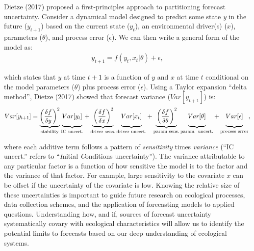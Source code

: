 \documentclass[12pt,]{article}
\begin{document}
Dietze (2017) proposed a first-principles approach to partitioning
forecast uncertainty. Consider a dynamical model designed to predict
some state \emph{y} in the future (\(y_{t+1}\)) based on the current
state (\(y_{t}\)), an environmental driver(s) (\(x\)), parameters
(\(\theta\)), and process error (\(\epsilon\)). We can then write a
general form of the model as: \vspace{-0.5em} \begin{align}
y_{t+1} = f(y_t, x_t|\theta) + \epsilon,
\end{align}

which states that \(y\) at time \(t+1\) is a function of \(y\) and \(x\)
at time \(t\) conditional on the model parameters (\(\theta\)) plus
process error (\(\epsilon\)). Using a Taylor expansion ``delta method'',
Dietze (2017) showed that forecast variance (\(Var[y_{t+1}]\)) is:
\vspace{-0.5em} \begin{align}
Var[y_{t+1}] = \underbrace{\left(\frac{\delta f}{\delta y} \right)^2}_{\text{stability}} 
               \underbrace{\vphantom{ \left(\frac{\delta f}{\delta y} \right)^2 } Var[y_t]}_{\text{IC uncert.}} +
               \underbrace{\vphantom{ \left(\frac{\delta f}{\delta y} \right)^2 }\left(\frac{\delta f}{\delta x} \right)^2}_{\text{driver sens.}} 
               \underbrace{\vphantom{ \left(\frac{\delta f}{\delta y} \right)^2 } Var[x_t]}_{\text{driver uncert.}} +
               \underbrace{\vphantom{ \left(\frac{\delta f}{\delta y} \right)^2 }\left(\frac{\delta f}{\delta \theta} \right)^2}_{\text{param sens.}}
               \underbrace{\vphantom{ \left(\frac{\delta f}{\delta y} \right)^2 } Var[\theta]}_{\text{param. uncert.}} +
               \underbrace{\vphantom{ \left(\frac{\delta f}{\delta y} \right)^2 } Var[\epsilon]}_{\text{process error}},
\end{align}

where each additive term follows a pattern of \emph{sensitivity} times
\emph{variance} (``IC uncert.'' refers to ``\emph{I}nitial
\emph{C}onditions uncertainty''). The variance attributable to any
particular factor is a function of how sensitive the model is to the
factor and the variance of that factor. For example, large sensitivity
to the covariate \(x\) can be offset if the uncertainty of the covariate
is low. Knowing the relative size of these uncertainties is important to
guide future research on ecological processes, data collection schemes,
and the application of forecasting models to applied questions.
Understanding how, and if, sources of forecast uncertainty
systematically covary with ecological characteristics will allow us to
identify the potential limits to forecasts based on our deep
understanding of ecological systems.
\end{document}
